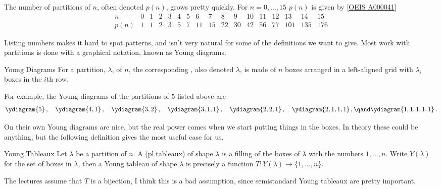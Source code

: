 \documentclass[fleqn]{NotesClass}
\begin{document}
    The number of partitions of \(n\), often denoted \(p(n)\), grows pretty quickly.
    For \(n = 0, \dotsc, 15\) \(p(n)\) is given by [\hyperlink{https://oeis.org/A000041}{OEIS A000041}]
    \begin{equation*}
        \begin{array}{r|rrrrrrrrrrrrrrrr}
            n & 0 & 1 & 2 & 3 & 4 & 5 & 6 & 7 & 8 & 9 & 10 & 11 & 12 & 13 & 14 & 15\\ \hline
            p(n) & 1 & 1 & 2 & 3 & 5 & 7 & 11 & 15 & 22 & 30 & 42 & 56 & 77 & 101 & 135 & 176
        \end{array}
    \end{equation*}
    
    Listing numbers makes it hard to spot patterns, and isn't very natural for some of the definitions we want to give.
    Most work with partitions is done with a graphical notation, known as Young diagrams.
    
    \begin{dfn}{Young Diagrams}{}
        For a partition, \(\lambda\), of \(n\), the corresponding , also denoted \(\lambda\), is made of \(n\) boxes arranged in a left-aligned grid with \(\lambda_i\) boxes in the \(i\)th row.
    \end{dfn}
    
    For example, the Young diagrams of the partitions of \(5\) listed above are
    \begin{equation*}
        \ydiagram{5}\,,\quad \ydiagram{4,1}\,,\quad \ydiagram{3,2}\,,\quad \ydiagram{3,1,1}\,,\quad \ydiagram{2,2,1}\,,\quad \ydiagram{2,1,1,1}\,,\qand \ydiagram{1,1,1,1,1}\,.
    \end{equation*}
    
    On their own Young diagrams are nice, but the real power comes when we start putting things in the boxes.
    In theory these could be anything, but the following definition gives the most useful case for us.
    
    \begin{dfn}{Young Tableaux}{}
        Let \(\lambda\) be a partition of \(n\).
        A  (pl.\@ tableaux) of shape \(\lambda\) is a filling of the boxes of \(\lambda\) with the numbers \(1, \dotsc, n\).
        Write \(Y(\lambda)\) for the set of boxes in \(\lambda\), then a Young tableau of shape \(\lambda\) is precisely a function \(T \colon Y(\lambda) \to \{1, \dotsc, n\}\).
        \begin{wrn}
            The lectures assume that \(T\) is a bijection, I think this is a bad assumption, since semistandard Young tableaux are pretty important.
        \end{wrn}
    \end{dfn}
    
\end{document}
